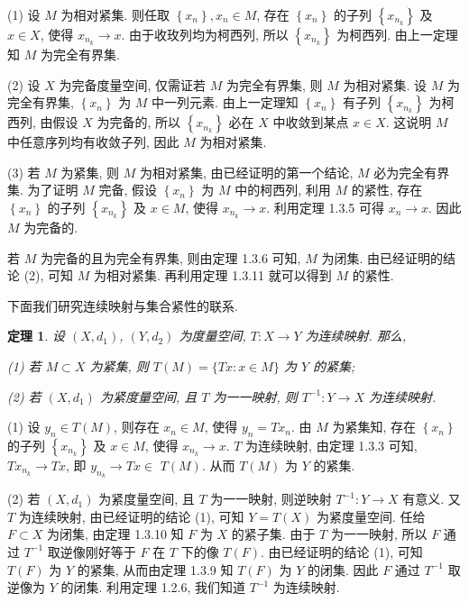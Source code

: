 \documentclass[openany]{ctexbook}
\makeatletter
\theoremstyle{kaiti}
\newtheorem{theorem}{定理}[section]
\theoremstyle{normal}
\renewenvironment{proof}[1][\proofname]{\par
    \pushQED{\qed}%
    \normalfont \topsep6\p@\@plus6\p@\relax
    \trivlist
    \item\relax
    {\heiti #1}\hspace{2\labelsep}\ignorespaces
  }{%
    \popQED\endtrivlist\@endpefalse
  }
\makeatother
\begin{document}
\begin{proof}
(1) 设 $M$ 为相对紧集. 则任取 $\left\{x_n\right\}, x_n \in M$, 存在 $\left\{x_n\right\}$ 的子列 $\left\{x_{n_{k}}\right\}$ 及 $x \in X$, 使得 $x_{n_{k}} \rightarrow x$. 由于收玫列均为柯西列, 所以 $\left\{x_{n_{k}}\right\}$ 为柯西列. 由上一定理知 $M$ 为完全有界集.

(2) 设 $X$ 为完备度量空间, 仅需证若 $M$ 为完全有界集, 则 $M$ 为相对紧集. 设 $M$ 为完全有界集, $\left\{x_n\right\}$ 为 $M$ 中一列元素. 由上一定理知 $\left\{x_n\right\}$ 有子列 $\left\{x_{n_{k}}\right\}$ 为柯西列, 由假设 $X$ 为完备的, 所以 $\left\{x_{n_{k}}\right\}$ 必在 $X$ 中收敛到某点 $x \in X$. 这说明 $M$ 中任意序列均有收敛子列, 因此 $M$ 为相对紧集.

(3) 若 $M$ 为紧集, 则 $M$ 为相对紧集, 由已经证明的第一个结论, $M$ 必为完全有界集. 为了证明 $M$ 完备, 假设 $\left\{x_n\right\}$ 为 $M$ 中的柯西列, 利用 $M$ 的紧性, 存在 $\left\{x_n\right\}$ 的子列 $\left\{x_{n_{k}}\right\}$ 及 $x \in M$, 使得 $x_{n_{k}} \rightarrow x$. 利用定理 1.3.5 可得 $x_n \rightarrow x$. 因此 $M$ 为完备的.

若 $M$ 为完备的且为完全有界集, 则由定理 1.3.6 可知, $M$ 为闭集. 由已经证明的结论 (2), 可知 $M$ 为相对紧集. 再利用定理 1.3.11 就可以得到 $M$ 的紧性.
\end{proof}

下面我们研究连续映射与集合紧性的联系.

\begin{theorem}
设 $(X, d_1)$, $(Y, d_2)$ 为度量空间, $T: X \rightarrow Y$ 为连续映射. 那么,

(1) 若 $M \subset X$ 为紧集, 则 $T(M)=\{T x: x \in M\}$ 为 $Y$ 的紧集;

(2) 若 $\left(X, d_1\right)$ 为紧度量空间, 且 $T$ 为一一映射, 则 $T^{-1}: Y \rightarrow X$ 为连续映射. 
\end{theorem}

\begin{proof}
(1) 设 $y_n \in T(M)$, 则存在 $x_n \in M$, 使得 $y_n=T x_n$. 由 $M$ 为紧集知, 存在 $\left\{x_n\right\}$ 的子列 $\left\{x_{n_{k}}\right\}$ 及 $x \in M$, 使得 $x_{n_{k}} \rightarrow x$. $T$ 为连续映射, 由定理 1.3.3 可知, $T x_{n_{k}} \rightarrow T x$, 即 $y_{n_{k}} \rightarrow T x \in$ $T(M)$. 从而 $T(M)$ 为 $Y$ 的紧集.

(2) 若 $\left(X, d_1\right)$ 为紧度量空间, 且 $T$ 为一一映射, 则逆映射 $T^{-1}: Y \rightarrow X$ 有意义. 又 $T$ 为连续映射, 由已经证明的结论 (1), 可知 $Y=T(X)$ 为紧度量空间. 任给 $F \subset X$ 为闭集, 由定理 1.3.10 知 $F$ 为 $X$ 的紧子集. 由于 $T$ 为一一映射, 所以 $F$ 通过 $T^{-1}$ 取逆像刚好等于 $F$ 在 $T$ 下的像 $T(F)$. 由已经证明的结论 (1), 可知 $T(F)$ 为 $Y$ 的紧集, 从而由定理 1.3.9 知 $T(F)$ 为 $Y$ 的闭集. 因此 $F$ 通过 $T^{-1}$ 取逆像为 $Y$ 的闭集. 利用定理 1.2.6, 我们知道 $T^{-1}$ 为连续映射.
\end{proof}
\end{document}
